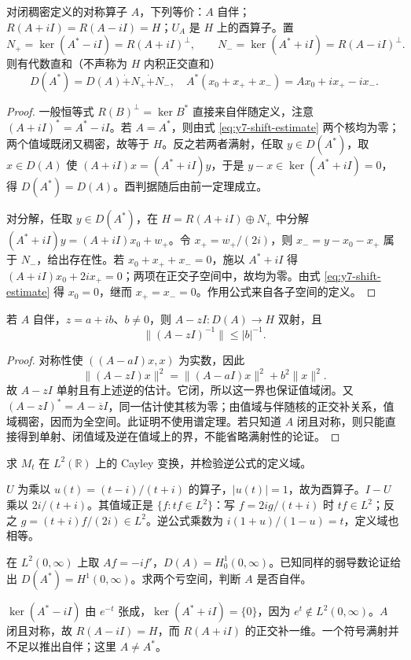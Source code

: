 \begin{theorem}[自伴判据与亏空间分解]\label{thm:y7-deficiency}
对闭稠密定义的对称算子 $A$，下列等价：$A$ 自伴；$R(A+iI)=R(A-iI)=H$；$U_A$ 是 $H$ 上的酉算子。置
\[
 N_+=\ker(A^*-iI)=R(A+iI)^\perp,\qquad
 N_-=\ker(A^*+iI)=R(A-iI)^\perp.
\]
则有代数直和（不声称为 $H$ 内积正交直和）
\[
 D(A^*)=D(A)\mathbin{\dot+}N_+\mathbin{\dot+}N_-,
 \quad A^*(x_0+x_++x_-)=Ax_0+ix_+-ix_-.
\]
\end{theorem}
\begin{proof}
一般恒等式 $R(B)^\perp=\ker B^*$ 直接来自伴随定义，注意 $(A+iI)^*=A^*-iI$。若 $A=A^*$，则由式 \eqref{eq:y7-shift-estimate} 两个核均为零；两个值域既闭又稠密，故等于 $H$。反之若两者满射，任取 $y\in D(A^*)$，取 $x\in D(A)$ 使 $(A+iI)x=(A^*+iI)y$，于是 $y-x\in\ker(A^*+iI)=0$，得 $D(A^*)=D(A)$。酉判据随后由前一定理成立。

对分解，任取 $y\in D(A^*)$，在 $H=R(A+iI)\oplus N_+$ 中分解
$(A^*+iI)y=(A+iI)x_0+w_+$。令 $x_+=w_+/(2i)$，则 $x_-=y-x_0-x_+$ 属于 $N_-$，给出存在性。若 $x_0+x_++x_-=0$，施以 $A^*+iI$ 得 $(A+iI)x_0+2ix_+=0$；两项在正交子空间中，故均为零。由式 \eqref{eq:y7-shift-estimate} 得 $x_0=0$，继而 $x_+=x_-=0$。作用公式来自各子空间的定义。
\end{proof}

\begin{proposition}[自伴算子的非实参数估计]\label{prop:y7-nonreal-inverse}
若 $A$ 自伴，$z=a+ib$、$b\ne0$，则 $A-zI:D(A)\to H$ 双射，且
\[
 \|(A-zI)^{-1}\|\le |b|^{-1}.
\]
\end{proposition}
\begin{proof}
对称性使 $((A-aI)x,x)$ 为实数，因此
\[
 \|(A-zI)x\|^2=\|(A-aI)x\|^2+b^2\|x\|^2.
\]
故 $A-zI$ 单射且有上述逆的估计。它闭，所以这一界也保证值域闭。又 $(A-zI)^*=A-\overline z I$，同一估计使其核为零；由值域与伴随核的正交补关系，值域稠密，因而为全空间。此证明不使用谱定理。若只知道 $A$ 闭且对称，则只能直接得到单射、闭值域及逆在值域上的界，不能省略满射性的论证。
\end{proof}

\begin{exercise}\label{ex:y7-cayley-mult}
求 $M_t$ 在 $L^2(\mathbb R)$ 上的 Cayley 变换，并检验逆公式的定义域。
\end{exercise}
\begin{solution}
$U$ 为乘以 $u(t)=(t-i)/(t+i)$ 的算子，$|u(t)|=1$，故为酉算子。$I-U$ 乘以 $2i/(t+i)$。其值域正是 $\{f:tf\in L^2\}$：写 $f=2ig/(t+i)$ 时 $tf\in L^2$；反之 $g=(t+i)f/(2i)\in L^2$。逆公式乘数为 $i(1+u)/(1-u)=t$，定义域也相等。
\end{solution}

\begin{exercise}[为什么两个符号都要检查]\label{ex:y7-halfline}
在 $L^2(0,\infty)$ 上取 $Af=-if'$，$D(A)=H_0^1(0,\infty)$。已知同样的弱导数论证给出 $D(A^*)=H^1(0,\infty)$。求两个亏空间，判断 $A$ 是否自伴。
\end{exercise}
\begin{solution}
$\ker(A^*-iI)$ 由 $e^{-t}$ 张成，$\ker(A^*+iI)=\{0\}$，因为 $e^t\notin L^2(0,\infty)$。$A$ 闭且对称，故 $R(A-iI)=H$，而 $R(A+iI)$ 的正交补一维。一个符号满射并不足以推出自伴；这里 $A\ne A^*$。
\end{solution}
